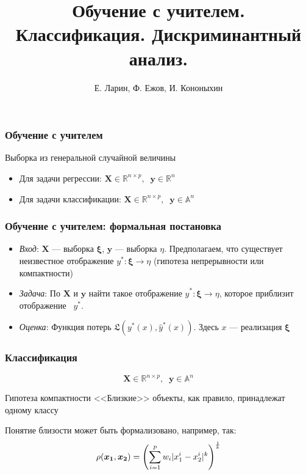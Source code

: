 \documentclass[11pt]{beamer}
\begin{document}
	\author{Е. Ларин, Ф. Ежов, И. Кононыхин }
	\title[Machine Learning] {Обучение с учителем. Классификация. Дискриминантный анализ. }
	\date{}
	\subject{Семинар по статистическому и машинному обучению}
	\begin{frame}[plain]
		\maketitle 
	\end{frame}
	
	\begin{frame}
		\frametitle{Обучение с учителем}
		
		Выборка из генеральной случайной величины
		\begin{itemize}
			\item Для задачи регрессии: $\bm{X} \in \mathbb{R}^{n\times p}, \;\;\mathbf{y}\in \mathbb{R}^n$
		    \item Для задачи классификации: $\bm{X} \in \mathbb{R}^{n\times p}, \;\;\mathbf{y}\in \mathbb{A}^n$
        \end{itemize}
		
	\end{frame}

	\begin{frame}
		\frametitle{Обучение с учителем: формальная постановка}
		\begin{itemize}
			\item \textit{Вход}: $\bm{X}$ --- выборка $\bm{\xi}$, $\bm{y}$ --- выборка $\eta$. Предполагаем, что существует неизвестное отображение $y^*: \bm{\xi} \to \eta$  (гипотеза непрерывности или компактности)
			
			\item \textit{Задача}: По $\bm{X}$ и $\bm{y}$ найти такое отображение $\hat{y}^*: \bm{\xi} \to \eta$, которое приблизит отображение  $y^*$. 
			
			\item \textit{Оценка}: Функция потерь $\mathfrak{L}(y^*(x), \hat{y}^*(x))$. Здесь $x$ --- реализация $\bm{\xi}$
		\end{itemize}
	\end{frame}
	
	\begin{frame}
		\frametitle{Классификация}
		\begin{equation}
			\bm{X} \in \mathbb{R}^{n\times p}, \;\;\mathbf{y}\in \mathbb{A}^n
		\end{equation}
		\begin{block}{Гипотеза компактности}
			<<Близкие>> объекты, как правило, принадлежат одному классу
		\end{block}
		Понятие близости может быть формализовано, например, так:
		$$\rho(\bm{x_1}, \bm{x_2}) = \left(\displaystyle{\sum_{i = 1}^p w_i|x_1^i - x_2^i|^k}\right)^{{1}\over {k}}$$
	\end{frame}
\end{document}
